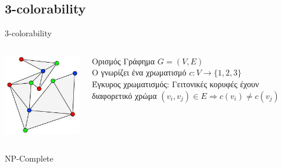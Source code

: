 \documentclass[handout]{beamer}
\begin{document}
\subsection{3-colorability}
\begin{frame}{3-colorability}
\begin{columns}
\begin{center}
\includegraphics[scale=0.5]{3cp.jpg}
\end{center}

\begin{block}{Ορισμός}
Γράφημα $G=(V,E)$ \\ \pause
O \prv  γνωρίζει ένα χρωματισμό  $c:V \rightarrow \{ 1,2,3 \}$  \\ \pause
Έγκυρος χρωματισμός: Γειτονικές κορυφές έχουν διαφορετικό χρώμα
$(v_i, v_j) \in E \Rightarrow   c(v_i) \neq c(v_j)$\\
\end{block}
\end{columns}
NP-Complete
\end{frame}
 
\end{document}
